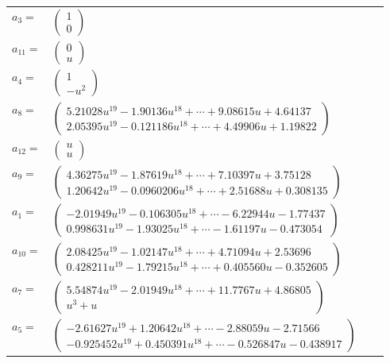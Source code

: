 \documentclass[1p]{elsarticle_modified}
\theoremstyle{definition}
\begin{document}
\begin{tabular}{m{7pt} m{180pt} m{7pt} m{180pt} }
\flushright $a_{3}=$&$\begin{pmatrix}1\\0\end{pmatrix}$ \\
\flushright $a_{11}=$&$\begin{pmatrix}0\\u\end{pmatrix}$ \\
\flushright $a_{4}=$&$\begin{pmatrix}1\\- u^2\end{pmatrix}$ \\
\flushright $a_{8}=$&$\begin{pmatrix}5.21028 u^{19}-1.90136 u^{18}+\cdots+9.08615 u+4.64137\\2.05395 u^{19}-0.121186 u^{18}+\cdots+4.49906 u+1.19822\end{pmatrix}$ \\
\flushright $a_{12}=$&$\begin{pmatrix}u\\u\end{pmatrix}$ \\
\flushright $a_{9}=$&$\begin{pmatrix}4.36275 u^{19}-1.87619 u^{18}+\cdots+7.10397 u+3.75128\\1.20642 u^{19}-0.0960206 u^{18}+\cdots+2.51688 u+0.308135\end{pmatrix}$ \\
\flushright $a_{1}=$&$\begin{pmatrix}-2.01949 u^{19}-0.106305 u^{18}+\cdots-6.22944 u-1.77437\\0.998631 u^{19}-1.93025 u^{18}+\cdots-1.61197 u-0.473054\end{pmatrix}$ \\
\flushright $a_{10}=$&$\begin{pmatrix}2.08425 u^{19}-1.02147 u^{18}+\cdots+4.71094 u+2.53696\\0.428211 u^{19}-1.79215 u^{18}+\cdots+0.405560 u-0.352605\end{pmatrix}$ \\
\flushright $a_{7}=$&$\begin{pmatrix}5.54874 u^{19}-2.01949 u^{18}+\cdots+11.7767 u+4.86805\\u^3+u\end{pmatrix}$ \\
\flushright $a_{5}=$&$\begin{pmatrix}-2.61627 u^{19}+1.20642 u^{18}+\cdots-2.88059 u-2.71566\\-0.925452 u^{19}+0.450391 u^{18}+\cdots-0.526847 u-0.438917\end{pmatrix}$ \\

\end{tabular}
\end{document}
